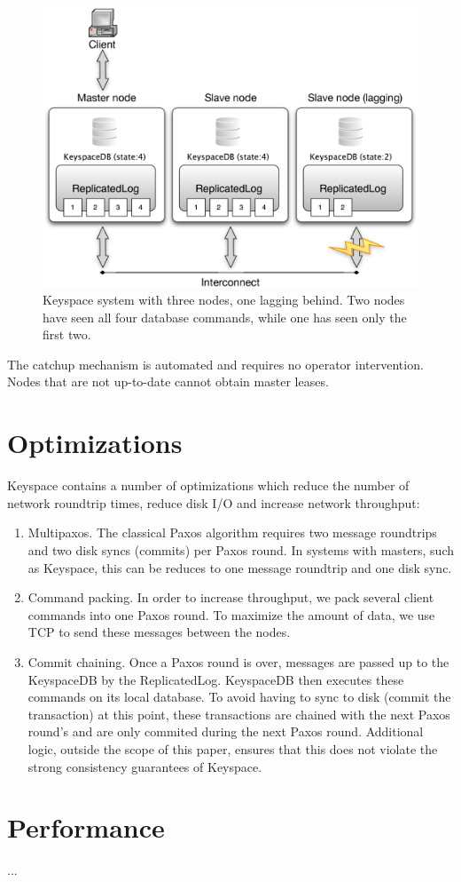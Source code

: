 \documentclass[12pt]{article}
\begin{document}
\begin{figure}[htbp]
\begin{center}
\includegraphics[scale=0.5]{comm1.eps}
\caption{Keyspace system with three nodes, one lagging behind. Two nodes have seen all four database commands, while one has seen only the first two.}
\end{center}
\end{figure}

The catchup mechanism is automated and requires no operator intervention. Nodes that are not up-to-date cannot obtain master leases.

\section{ Optimizations }

Keyspace contains a number of optimizations which reduce the number of network roundtrip times, reduce disk I/O and increase network throughput:

\begin{enumerate}
\item Multipaxos. The classical Paxos algorithm requires two message roundtrips and two disk syncs (commits) per Paxos round. In systems with masters, such as Keyspace, this can be reduces to one message roundtrip and one disk sync.
\item Command packing. In order to increase throughput, we pack several client commands into one Paxos round. To maximize the amount of data, we use TCP to send these messages between the nodes.
\item Commit chaining. Once a Paxos round is over, messages are passed up to the KeyspaceDB by the ReplicatedLog. KeyspaceDB then executes these commands on its local database. To avoid having to sync to disk (commit the transaction) at this point, these transactions are chained with the next Paxos round's and are only commited during the next Paxos round. Additional logic, outside the scope of this paper, ensures that this does not violate the strong consistency guarantees of Keyspace.
\end{enumerate}

\section{ Performance }

...
\end{document}
